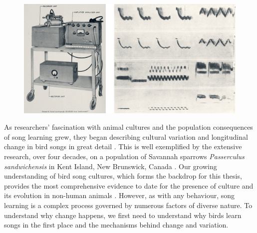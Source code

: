 \begin{figure}[bh!]
    \centering
    \includegraphics[width=\linewidth]{figures/chapter_1/spectrograph.png}
    \label{c1_fig:spectrograph}
\end{figure}


As researchers' fascination with animal cultures and the population consequences of song learning grew, they began describing cultural variation and longitudinal change in bird songs in great detail \parencite{nelson2017, zimmerman2016, zann1993, baptista1977, lachlan2003a}. This is well exemplified by the extensive research, over four decades, on a population of Savannah sparrows \textit{Passerculus sandwichensis} in Kent Island, New Brunswick, Canada \autocite{williams2013, mennill2018, williams2019, hensel2022, dixon1978}. Our growing understanding of bird song cultures, which forms the backdrop for this thesis, provides the most comprehensive evidence to date for the presence of culture and its evolution in non-human animals \autocite{slater2003a, aplin2019}. However, as with any behaviour, song learning is a complex process governed by numerous factors of diverse nature. To understand why change happens, we first need to understand why birds learn songs in the first place and the mechanisms behind change and variation.

